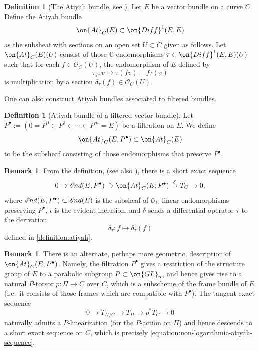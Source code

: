 \documentclass[12 pt]{amsart}
\theoremstyle{plain}
\theoremstyle{definition}
\newtheorem{definition}[subsubsection]{Definition}
\newtheorem{remark}[subsubsection]{Remark}
\theoremstyle{remark}
\numberwithin{equation}{section}
\newcommand*{\sheafend}{\mathscr{E}\kern -1pt nd}
\begin{document}
\begin{definition}[The Atiyah bundle, see
	] 
	\label{definition:atiyah}	
	Let $E$ be a
vector bundle on a curve $C$. 
Define the Atiyah bundle $$\on{At}_C(E)\subset \on{Diff}^1({E}, {E})$$ as the
subsheaf with sections on an open set $U \subset C$ given as follows.
Let $\on{At}_C(E)(U)$ consist of those $\mathbb{C}$-endomorphisms $\tau \in
\on{Diff}^1({E}, {E})(U)$ such that for each $f\in \mathscr{O}_C(U)$, the endomorphism of ${E}$ defined by $$\tau_f: v\mapsto \tau(fv)-f\tau(v)$$ is multiplication by a section $\delta_\tau(f)\in \mathscr{O}_C(U)$. 
\end{definition}

One can also construct Atiyah bundles associated to filtered bundles.
\begin{definition}[Atiyah bundle of a filtered vector bundle]
	\label{definition:atiyah-filtered}
Let $P^\bullet := (0 = P^0 \subset P^1
\subset \cdots \subset P^m = E)$ be a filtration on $E$.
We define $$\on{At}_C(E, P^\bullet)\subset \on{At}_C(E)$$ to be the subsheaf
consisting of those endomorphisms that preserve $P^\bullet$. 
\end{definition}



\begin{remark}
	\label{remark:atiyah-exact-sequence}
	From the definition, (see also \cite[(2.7)]{BHH:logarithmic}), there is a 
short exact sequence 
\begin{equation} \label{equation:non-logarithmic-atiyah-sequence} 0\to
	\sheafend(E, P^\bullet)\overset{\iota}{\to} \on{At}_C(E,
P^\bullet)\overset{\delta}{\to} T_C\to 0,\end{equation} where
$\sheafend(E, P^\bullet)\subset \sheafend(E)$ is the subsheaf of $\mathscr{O}_C$-linear endomorphisms preserving $P^\bullet$, $\iota$ is the evident inclusion, 
and $\delta$ sends a differential operator $\tau$ to the derivation
$$\delta_\tau: f\mapsto \delta_\tau(f)$$ defined in 
\autoref{definition:atiyah}.
\end{remark}

\begin{remark}
    There is an alternate, perhaps more geometric, description of $\on{At}_C(E,
    P^\bullet)$. Namely, the filtration $P^\bullet$ gives a restriction of
    the structure group of ${E}$ to a parabolic subgroup ${P}\subset
    \on{GL}_n$, and hence gives rise to a natural ${P}$-torsor $p:\Pi\to C$
    over $C$, which is a subscheme of the frame bundle of ${E}$ (i.e.~it
    consists of those frames which are compatible with $P^\bullet$). The tangent
    exact sequence $$0\to T_{\Pi/C}\to T_\Pi\to p^*T_C\to 0$$ naturally admits a ${P}$-linearization (for the ${P}$-action on $\Pi$) 
    and hence descends to a short exact sequence on
    $C$, which is precisely \eqref{equation:non-logarithmic-atiyah-sequence}.
\end{remark}
\end{document}
